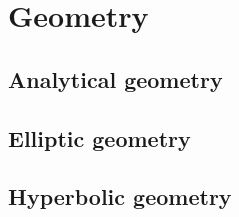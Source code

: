 \chapter{Geometry}
\section{Analytical geometry}
\section{Elliptic geometry}
\section{Hyperbolic geometry}
